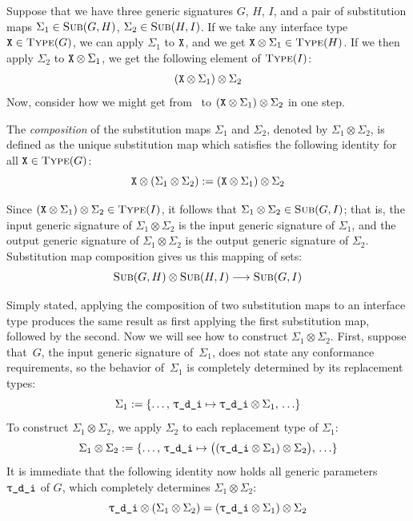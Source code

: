 \documentclass[../generics]{subfiles}
\begin{document}
Suppose that we have three generic signatures $G$, $H$, $I$, and a pair of substitution maps $\Sigma_1\in\textsc{Sub}({G, H})$, $\Sigma_2\in\textsc{Sub}({H, I})$. If we take any interface type $\texttt{X}\in\textsc{Type}({G})$, we can apply $\Sigma_1$ to $\texttt{X}$, and we get $\texttt{X}\otimes\Sigma_1\in\textsc{Type}({H})$. If we then apply $\Sigma_2$ to $\texttt{X}\otimes\Sigma_1$, we get the following element of $\textsc{Type}({I})$:
\[(\texttt{X}\otimes\Sigma_1)\otimes\Sigma_2\]
Now, consider how we might get from \tX\ to $(\texttt{X}\otimes\Sigma_1)\otimes\Sigma_2$ in one step.
\begin{definition}\label{subst map composition}
The \emph{composition} of the substitution maps $\Sigma_1$ and $\Sigma_2$, denoted by \index{$\otimes$}$\Sigma_1\otimes\Sigma_2$, is defined as the unique substitution map which satisfies the following identity for all $\texttt{X}\in\textsc{Type}({G})$:
\[\texttt{X}\otimes(\Sigma_1\otimes\Sigma_2):=(\texttt{X}\otimes\Sigma_1)\otimes\Sigma_2\]

Since $(\texttt{X}\otimes\Sigma_1)\otimes\Sigma_2\in\textsc{Type}({I})$, it follows that $\Sigma_1\otimes\Sigma_2\in\textsc{Sub}({G, I})$; that is, the input generic signature of $\Sigma_1 \otimes \Sigma_2$ is the input generic signature of $\Sigma_1$, and the output generic signature of $\Sigma_1 \otimes \Sigma_2$ is the output generic signature of $\Sigma_2$. Substitution map composition gives us this mapping of sets:
\[\textsc{Sub}({G, H})\otimes\textsc{Sub}({H, I})\longrightarrow\textsc{Sub}({G, I})\]
\end{definition}

Simply stated, applying the composition of two substitution maps to an interface type produces the same result as first applying the first substitution map, followed by the second. Now we will see how to construct $\Sigma_1 \otimes \Sigma_2$. First, suppose that~$G$, the input generic signature of~$\Sigma_1$, does not state any conformance requirements, so the behavior of~$\Sigma_1$ is completely determined by its replacement types:
\[\Sigma_1 := \SubstMap{\ldots,\,\SubstType{\ttgp{d}{i}}{$\ttgp{d}{i}\otimes\Sigma_1$},\,\ldots}\]
To construct $\Sigma_1 \otimes \Sigma_2$, we apply $\Sigma_2$ to each replacement type of $\Sigma_1$:
\[
\Sigma_1\otimes\Sigma_2 := \SubstMap{
\ldots,\,
\SubstType{\ttgp{d}{i}}{$\bigl((\ttgp{d}{i}\otimes\Sigma_1)\otimes\Sigma_2\bigr)$},\,
\ldots
}
\]
It is immediate that the following identity now holds all generic parameters $\ttgp{d}{i}$ of $G$, which completely determines $\Sigma_1 \otimes \Sigma_2$:
\[
\ttgp{d}{i}\otimes(\Sigma_1\otimes\Sigma_2)=(\ttgp{d}{i}\otimes\Sigma_1)\otimes\Sigma_2
\]
\end{document}
